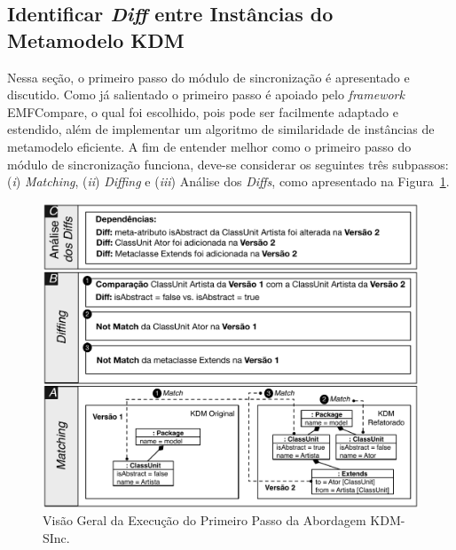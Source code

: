 
\subsection{Identificar \textit{Diff} entre Instâncias do Metamodelo KDM}\label{sec:diff_entre_kdm}

Nessa seção, o primeiro passo do módulo de sincronização é apresentado e discutido. Como já salientado o primeiro passo é apoiado pelo \textit{framework} EMFCompare, o qual foi escolhido, pois pode ser facilmente adaptado e estendido, além de implementar um algoritmo de similaridade de instâncias de metamodelo eficiente. A fim de entender melhor como o primeiro passo do módulo de sincronização funciona, deve-se considerar os seguintes três subpassos: (\textit{i}) \textit{Matching}, (\textit{ii}) \textit{Diffing} e (\textit{iii}) Análise dos \textit{Diffs}, como apresentado na Figura~\ref{fig:diff_emf_compare}. 

\begin{figure}[h]
	\centering
	\caption{Visão Geral da Execução do Primeiro Passo da Abordagem KDM-SInc.}
	\label{fig:diff_emf_compare}
	\includegraphics[scale=0.7]{images/matching_diffing_analise_3}
	\fautor
\end{figure}

